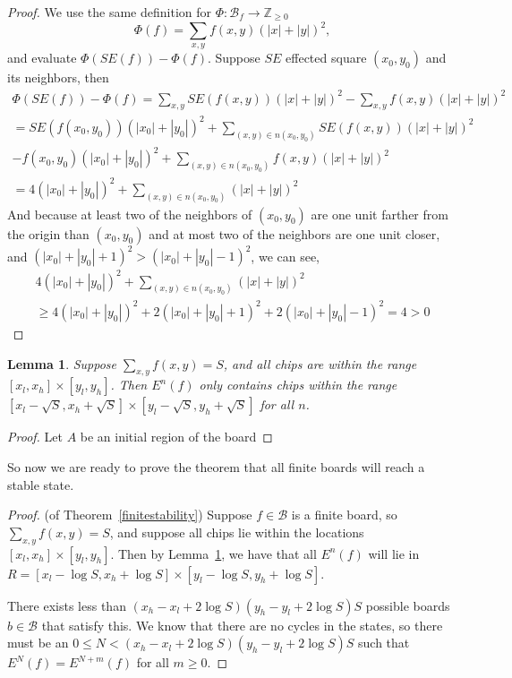 \documentclass[11pt]{article}
\newtheorem{lemma}{Lemma}
\begin{document}
\begin{proof}
We use the same definition for $\Phi: \mathcal{B}_f \rightarrow \mathbb{Z}_{\geq 0}$ 
\[ \Phi(f) = \sum_{x,y} f(x,y)(|x|+|y|)^2, \]
and evaluate $\Phi(SE(f)) - \Phi(f)$. Suppose $SE$ effected square $(x_0,y_0)$ and its neighbors, then
\begin{align}
\Phi(SE(f)) - \Phi(f) =\sum_{x,y} SE(f(x,y))(|x|+|y|)^2 - \sum_{x,y} f(x,y)(|x|+|y|)^2 \\
= SE(f(x_0,y_0))(|x_0|+|y_0|)^2 + \sum_{(x,y) \in n(x_0,y_0)} SE(f(x,y))(|x|+|y|)^2 \\- f(x_0,y_0)(|x_0|+|y_0|)^2 + \sum_{(x,y) \in n(x_0,y_0)} f(x,y)(|x|+|y|)^2 \\
= 4(|x_0| + |y_0|)^2 +\sum_{(x,y) \in n(x_0, y_0)} (|x| + |y|)^2
\end{align}
And because at least two of the neighbors of $(x_0, y_0)$ are one unit farther from the origin than $(x_0, y_0)$ and at most two of the neighbors are one unit closer, and $(|x_0|+|y_0| +1)^2 > (|x_0|+|y_0| - 1)^2$, we can see,
\begin{align}
4(|x_0| + |y_0|)^2 +\sum_{(x,y) \in n(x_0, y_0)} (|x| + |y|)^2  \\ 
\geq 4(|x_0| + |y_0|)^2 + 2 (|x_0| + |y_0|+1)^2 + 2 (|x_0| + |y_0|-1)^2 = 4 >0
\end{align}
\end{proof}


\begin{lemma}
\label{finiteextension}
Suppose $\sum_{x,y} f(x,y) = S$, and all chips are within the range $[x_l, x_h] \times [y_l, y_h]$. Then $E^n(f)$ only contains chips within the range $[x_l - \sqrt{S}, x_h + \sqrt{S}] \times [y_l-\sqrt{S}, y_h+\sqrt{S}]$ for all $n$.
\end{lemma}

\begin{proof}
Let $A$ be an initial region of the board
\end{proof}

So now we are ready to prove the theorem that all finite boards will reach a stable state. 

\begin{proof}
(of Theorem~\ref{finitestability}) Suppose $f \in \mathcal{B}$ is a finite board, so $\sum_{x,y} f(x,y) = S$, and suppose all chips lie within the locations $[x_l, x_h] \times [y_l, y_h]$. Then by Lemma~\ref{finiteextension}, we have that all $E^n(f)$ will lie in $R = [x_l - \log S, x_h + \log S] \times [y_l - \log S, y_h + \log S]$. 

There exists less than $(x_h - x_l + 2\log S)(y_h - y_l + 2\log S)S$ possible boards $b \in \mathcal{B}$ that satisfy this. We know that there are no cycles in the states, so there must be an $0 \leq N < (x_h - x_l + 2\log S)(y_h - y_l + 2\log S)S$ such that $E^N(f) = E^{N+m}(f)$ for all $m \geq 0$.
\end{proof}
\end{document}
